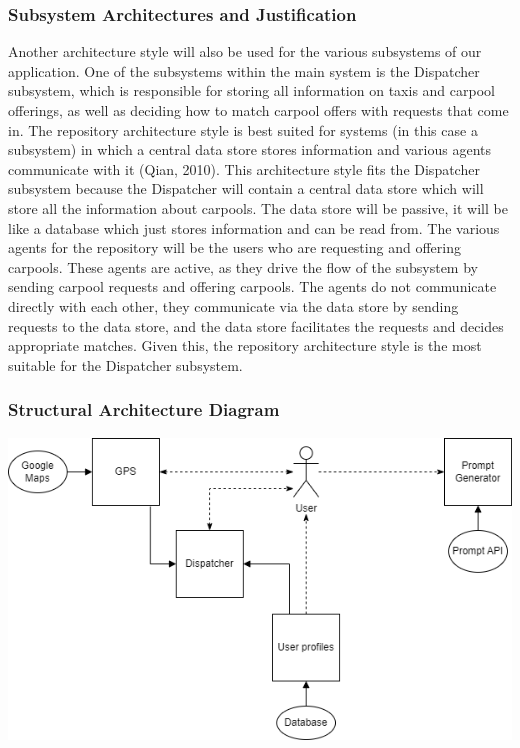 \documentclass[]{article}
\begin{document}
\subsubsection{Subsystem Architectures and Justification}
Another architecture style will also be used for the various subsystems of our application. One of the subsystems within the main system is the Dispatcher 
subsystem, which is responsible for storing all information on taxis and carpool offerings, as well as deciding how to match carpool offers with 
requests that come in. The repository architecture style is best suited for systems (in this case a subsystem) in which a central data store stores information 
and various agents communicate with it (Qian, 2010). This architecture style fits the Dispatcher subsystem because the Dispatcher will contain a central data store which 
will store all the information about carpools. The data store will be passive, it will be like a database which just stores information and can be read from. 
The various agents for the repository will be the users who are requesting and offering carpools. These agents are active, as they drive the flow of the 
subsystem by sending carpool requests and offering carpools. The agents do not communicate directly with each other, they communicate via the data store by 
sending requests to the data store, and the data store facilitates the requests and decides appropriate matches. Given this, the repository architecture style 
is the most suitable for the Dispatcher subsystem.

\subsubsection{Structural Architecture Diagram}
\includegraphics[scale = 0.7]{Graphics/subsystems_diagram_3.1.png}
\end{document}
